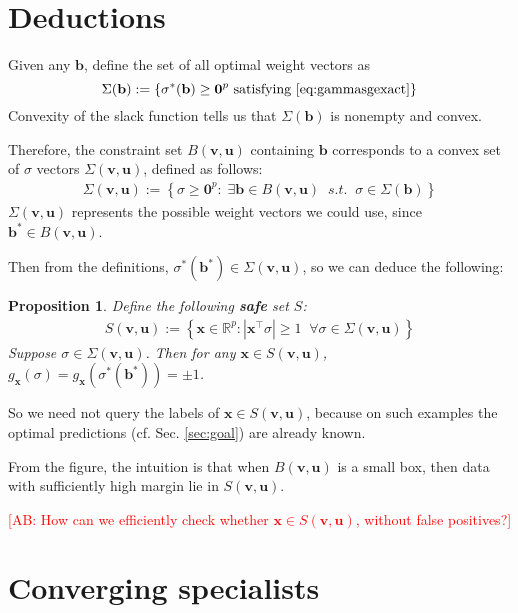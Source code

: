 \documentclass{article}
\newcommand{\vx}{\mathbf{x}}
\newcommand{\vb}{\mathbf{b}}
\newcommand{\vu}{\mathbf{u}}
\newcommand{\vv}{\mathbf{v}}
\newcommand{\vzero}{\mathbf{0}}
\newtheorem{prop}[thm]{Proposition}
\newcommand{\RR}{\mathbb{R}}      %
\newcommand{\abs}[1]{\left| #1 \right|}
\newcommand{\lrsetb}[1]{\left\{#1\right\}}
\newcommand{\authcmt}[2]{\textcolor{#1}{#2}}
\newcommand{\akshay}[1]{\authcmt{red}{[AB: #1]}}
\begin{document}
\section{Deductions}

Given any $\vb$, define the set of all optimal weight vectors as 
$$ \Sigma (\vb) := \lrsetb{ \sigma^* (\vb) \geq \vzero^p \mbox{ satisfying } \eqref{eq:gammasgexact} } $$ 
Convexity of the slack function tells us that 
$\Sigma (\vb)$ is nonempty and convex. 

Therefore, the constraint set $B (\vv,\vu)$ containing $\vb$ corresponds to a convex set of $\sigma$ vectors $\Sigma (\vv, \vu)$, defined as follows: 
\begin{align*}
\Sigma (\vv, \vu) := \lrsetb{ \sigma \geq \vzero^p : \;\exists \vb \in B (\vv,\vu) \;\;s.t.\;\; \sigma \in \Sigma (\vb)}
\end{align*}
$\Sigma (\vv, \vu)$ represents the possible weight vectors we could use, since  $\vb^* \in B (\vv,\vu)$. 

Then from the definitions, $\sigma^* (\vb^*) \in \Sigma (\vv, \vu)$, so we can deduce the following: 
\begin{prop}
\label{prop:safeset}
Define the following \textbf{safe} set $S$: 
\begin{align*}
S (\vv, \vu) := \lrsetb{ \vx \in \RR^p : \abs{ \vx^\top \sigma} \geq 1 \;\; \forall \sigma \in \Sigma (\vv, \vu) }
\end{align*}
Suppose $\sigma \in \Sigma (\vv, \vu)$. Then for any $\vx \in S (\vv, \vu)$, 
$g_{\vx} (\sigma) = g_{\vx} (\sigma^* (\vb^*)) = \pm 1$. 
\end{prop}
So we need not query the labels of $\vx \in S (\vv, \vu)$, 
because on such examples the optimal predictions (cf. Sec. \ref{sec:goal}) are already known.

From the figure, the intuition is that when $B (\vv, \vu)$ is a small box, 
then data with sufficiently high margin lie in $S (\vv, \vu)$. 

\akshay{How can we efficiently check whether $\vx \in S (\vv, \vu)$, without false positives?}

\section{Converging specialists}
\end{document}
